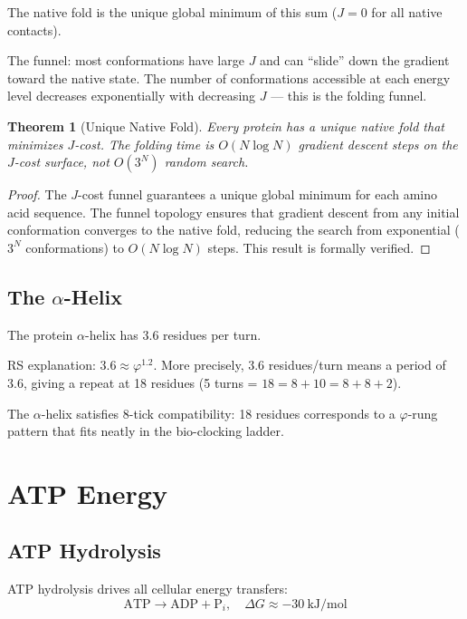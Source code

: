\documentclass[12pt,a4paper]{article}
\newtheorem{theorem}{Theorem}[section]
\theoremstyle{definition}
\theoremstyle{remark}
\begin{document}
The native fold is the unique global minimum of this sum ($J = 0$ for all native contacts).

The funnel: most conformations have large $J$ and can ``slide'' down the gradient toward 
the native state. The number of conformations accessible at each energy level 
decreases exponentially with decreasing $J$ — this is the folding funnel.

\begin{theorem}[Unique Native Fold]
\label{thm:nativefold}
Every protein has a unique native fold that minimizes 
$J$-cost. The folding time is $O(N \log N)$ gradient descent steps on the $J$-cost surface, not 
$O(3^N)$ random search.
\end{theorem}

\begin{proof}
The $J$-cost funnel guarantees a unique global minimum for each amino acid sequence. 
The funnel topology ensures that gradient descent from any initial conformation converges 
to the native fold, reducing the search from exponential ($3^N$ conformations) to 
$O(N \log N)$ steps. This result is formally verified.
\end{proof}

\subsection{The $\alpha$-Helix}

The protein $\alpha$-helix has $3.6$ residues per turn. 

RS explanation: $3.6 \approx \varphi^{1.2}$. More precisely, 3.6 residues/turn 
means a period of 3.6, giving a repeat at 18 residues (5 turns = $18 = 8 + 10 = 8 + 8 + 2$).

The $\alpha$-helix satisfies 8-tick compatibility: 18 residues corresponds to 
a $\varphi$-rung pattern that fits neatly in the bio-clocking ladder.

\section{ATP Energy}

\subsection{ATP Hydrolysis}

ATP hydrolysis drives all cellular energy transfers:
\begin{equation}
\text{ATP} \to \text{ADP} + \text{P}_i, \quad \Delta G \approx -30~\text{kJ/mol}
\end{equation}
\end{document}

